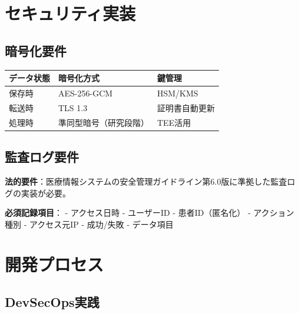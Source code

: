 \documentclass[
  a4paper,
  a4paper,
  11pt]{ltjsbook}
\begin{document}
\section{セキュリティ実装}\label{ux30bbux30adux30e5ux30eaux30c6ux30a3ux5b9fux88c5}

\subsection{暗号化要件}\label{ux6697ux53f7ux5316ux8981ux4ef6}

\begin{longtable}[]{@{}lll@{}}
\toprule\noalign{}
データ状態 & 暗号化方式 & 鍵管理 \\
\midrule\noalign{}
\endhead
\bottomrule\noalign{}
\endlastfoot
保存時 & AES-256-GCM & HSM/KMS \\
転送時 & TLS 1.3 & 証明書自動更新 \\
処理時 & 準同型暗号（研究段階） & TEE活用 \\
\end{longtable}

\subsection{監査ログ要件}\label{ux76e3ux67fbux30edux30b0ux8981ux4ef6}

\begin{tcolorbox}[enhanced jigsaw, toprule=.15mm, bottomtitle=1mm, coltitle=black, left=2mm, opacityback=0, arc=.35mm, colbacktitle=quarto-callout-note-color!10!white, colback=white, opacitybacktitle=0.6, bottomrule=.15mm, rightrule=.15mm, breakable, title=\textcolor{quarto-callout-note-color}{\faInfo}\hspace{0.5em}{Note}, toptitle=1mm, titlerule=0mm, colframe=quarto-callout-note-color-frame, leftrule=.75mm]

\textbf{法的要件}：医療情報システムの安全管理ガイドライン第6.0版に準拠した監査ログの実装が必要。

\end{tcolorbox}

\textbf{必須記録項目}： - アクセス日時 - ユーザーID - 患者ID（匿名化） -
アクション種別 - アクセス元IP - 成功/失敗 - データ項目

\section{開発プロセス}\label{ux958bux767aux30d7ux30edux30bbux30b9}

\subsection{DevSecOps実践}\label{devsecopsux5b9fux8df5}
\end{document}
